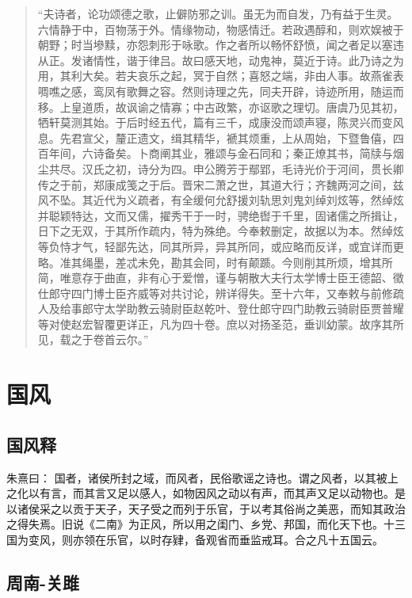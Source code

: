 \documentclass[
]{book}
\theoremstyle{definition}
\theoremstyle{definition}
\theoremstyle{definition}
\theoremstyle{definition}
\theoremstyle{remark}
\begin{document}
\begin{quote}
``夫诗者，论功颂德之歌，止僻防邪之训。虽无为而自发，乃有益于生灵。六情静于中，百物荡于外。情缘物动，物感情迁。若政遇醇和，则欢娱被于朝野；时当墋黩，亦怨刺形于咏歌。作之者所以畅怀舒愤，闻之者足以塞违从正。发诸情性，谐于律吕。故曰感天地，动鬼神，莫近于诗。此乃诗之为用，其利大矣。若夫哀乐之起，冥于自然；喜怒之端，非由人事。故燕雀表啁噍之感，鸾凤有歌舞之容。然则诗理之先，同夫开辟，诗迹所用，随运而移。上皇道质，故讽谕之情寡；中古政繁，亦讴歌之理切。唐虞乃见其初，牺轩莫测其始。于后时经五代，篇有三千，成康没而颂声寝，陈灵兴而变风息。先君宣父，釐正遗文，缉其精华，褫其烦重，上从周始，下暨鲁僖，四百年间，六诗备矣。卜商阐其业，雅颂与金石同和；秦正燎其书，简牍与烟尘共尽。汉氏之初，诗分为四。申公腾芳于鄢郢，毛诗光价于河间，贯长卿传之于前，郑康成笺之于后。晋宋二萧之世，其道大行；齐魏两河之间，兹风不坠。其近代为义疏者，有全缓何允舒援刘轨思刘鬼刘绰刘炫等，然绰炫并聪颖特达，文而又儒，擢秀干于一时，骋绝辔于千里，固诸儒之所揖让，日下之无双，于其所作疏内，特为殊绝。今奉敕删定，故据以为本。然绰炫等负恃才气，轻鄙先达，同其所异，异其所同，或应略而反详，或宜详而更略。准其绳墨，差忒未免，勘其会同，时有颠踬。今则削其所烦，增其所简，唯意存于曲直，非有心于爱憎，谨与朝散大夫行太学博士臣王德韶、徵仕郎守四门博士臣齐威等对共讨论，辨详得失。至十六年，又奉敕与前修疏人及给事郎守太学助教云骑尉臣赵乾叶、登仕郎守四门助教云骑尉臣贾普耀等对使赵宏智覆更详正，凡为四十卷。庶以对扬圣范，垂训幼蒙。故序其所见，载之于卷首云尔。''
\end{quote}

\hypertarget{ux56fdux98ce}{%
\chapter*{国风}\label{ux56fdux98ce}}

\hypertarget{ux56fdux98ceux91ca}{%
\section{国风释}\label{ux56fdux98ceux91ca}}

朱熹曰：
国者，诸侯所封之域，而风者，民俗歌谣之诗也。谓之风者，以其被上之化以有言，而其言又足以感人，如物因风之动以有声，而其声又足以动物也。是以诸侯采之以贡于天子，天子受之而列于乐官，于以考其俗尚之美恶，而知其政治之得失焉。旧说《二南》为正风，所以用之闺门、乡党、邦国，而化天下也。十三国为变风，则亦领在乐官，以时存肄，备观省而垂监戒耳。合之凡十五国云。

\hypertarget{ux5468ux5357-ux5173ux96ce}{%
\section{周南-关雎}\label{ux5468ux5357-ux5173ux96ce}}
\end{document}
